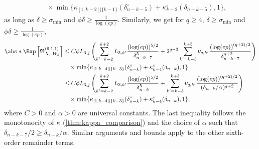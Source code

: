 \documentclass[aos]{imsart}
\begin{document}
\begin{appendix}
\begin{equation*}
\begin{aligned}
    & \quad \times \min\{\kappa_{[1,k-2]|\{k-1\}}(\delta_{n-k-5}^\circ) + \kappa^\circ_{k-2}(\delta_{n-k-5}), 1\},
\end{aligned}
\end{equation*}
as long as $\delta \geq \sigma_{\min}$ and $\phi\delta \geq \frac{1}{\log(ep)}$.
Similarly, we get for $q \geq 4$, $\delta \geq \sigma_{\min}$ and $\phi\delta \geq \frac{1}{\log(ep)}$,
\begin{equation*}
\begin{aligned}
    \abs*{\Exp \left[ \mathfrak{R}_{X_j,W_k}^{(6,1,1)} \right]} 
    & \leq C \phi L_{3,j} \left( \begin{aligned}
        \sum_{k'=k-2}^{k+2} L_{3,k'} \frac{(\log(ep))^{5/2}}{\delta_{n-k-7}^5}
        + 2^{q-3} \sum_{k'=k-3}^{k+3} \nu_{q,k'} \frac{ {(\log(ep))}^{(q+2)/2}}{\delta_{n-k-7}^{q+2}}
    \end{aligned} \right) \\
    & \quad \times \min\{\kappa_{[1,k-4]|\{k-3\}}(\delta_{n-k}^\circ) + \kappa^\circ_{k-4}(\delta_{n-k}), 1\} \\
    & \leq C \phi L_{3,j} \left( \begin{aligned}
        \sum_{k'=k-2}^{k+2} L_{3,k'} \frac{(\log(ep))^{5/2}}{\delta_{n-k}^5}
        + \sum_{k'=k-3}^{k+3} \nu_{q,k'} \frac{ {(\log(ep))}^{(q+2)/2}}{(\delta_{n-k}/\alpha)^{q+2}}
    \end{aligned} \right) \\
    & \quad \times \min\{\kappa_{[1,k-4]|\{k-3\}}(\delta_{n-k}^\circ) + \kappa^\circ_{k-4}(\delta_{n-k}), 1\},
\end{aligned}
\end{equation*}
where $C > 0$ and $\alpha > 0$ are universal constants.
The last inequality follows the monotonocity of $\kappa$ (\cref{thm:kappa_comparison}) and the choice of $\alpha$ such that $\delta_{n-k-7}/2 \geq \delta_{n-k}/\alpha$.
Similar arguments and bounds apply to the other sixth-order remainder terms.











\end{appendix}
\end{document}
